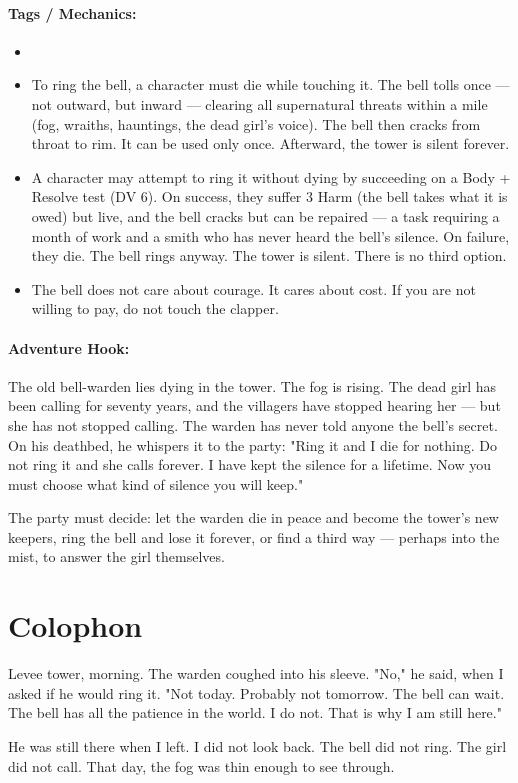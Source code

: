 \paragraph{Tags / Mechanics:}
\begin{itemize}
\item [WARD] [SILENCE] [SACRIFICE] [BANISH]
\item To ring the bell, a character must die while touching it. The bell tolls once — not outward, but inward — clearing all supernatural threats within a mile (fog, wraiths, hauntings, the dead girl's voice). The bell then cracks from throat to rim. It can be used only once. Afterward, the tower is silent forever.
\item A character may attempt to ring it without dying by succeeding on a Body + Resolve test (DV 6). On success, they suffer 3 Harm (the bell takes what it is owed) but live, and the bell cracks but can be repaired — a task requiring a month of work and a smith who has never heard the bell's silence. On failure, they die. The bell rings anyway. The tower is silent. There is no third option.
\item The bell does not care about courage. It cares about cost. If you are not willing to pay, do not touch the clapper.
\end{itemize}

\paragraph{Adventure Hook:}
The old bell-warden lies dying in the tower. The fog is rising. The dead girl has been calling for seventy years, and the villagers have stopped hearing her — but she has not stopped calling. The warden has never told anyone the bell's secret. On his deathbed, he whispers it to the party: "Ring it and I die for nothing. Do not ring it and she calls forever. I have kept the silence for a lifetime. Now you must choose what kind of silence you will keep."

The party must decide: let the warden die in peace and become the tower's new keepers, ring the bell and lose it forever, or find a third way — perhaps into the mist, to answer the girl themselves.

\section*{Colophon}
Levee tower, morning. The warden coughed into his sleeve. "No," he said, when I asked if he would ring it. "Not today. Probably not tomorrow. The bell can wait. The bell has all the patience in the world. I do not. That is why I am still here."

He was still there when I left. I did not look back. The bell did not ring. The girl did not call. That day, the fog was thin enough to see through.